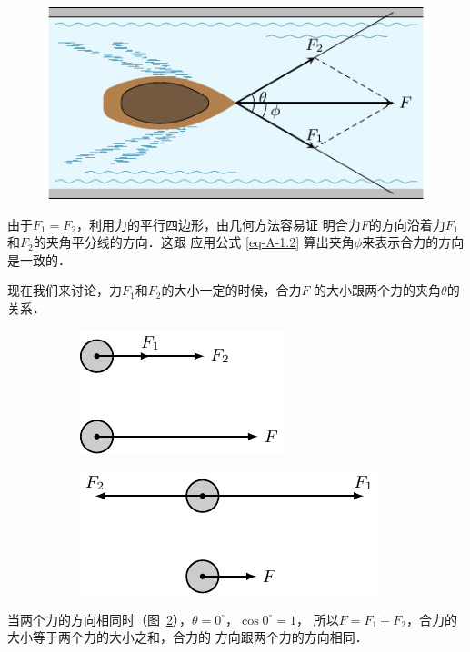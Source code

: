 \begin{figure} [htp]
\centering
\includegraphics{fig/A/1-25.pdf} 
\caption{} \label{fig_A_1-25} 
\end{figure} 

    由于$F_1=F_2$，利用力的平行四边形，由几何方法容易证
明合力$F$的方向沿着力$F_1$和$F_2$的夹角平分线的方向．这跟
应用公式 \eqref{eq-A-1.2} 算出夹角$\phi$来表示合力的方向是一致的．

    现在我们来讨论，力$F_1$和$F_2$的大小一定的时候，合力$F$
的大小跟两个力的夹角$\theta$的关系．

\begin{figure} [htp]
\begin{subfigure} {0.46\linewidth} 
	\centering
	\includegraphics{fig/A/1-26a.pdf} 
	\caption{} \label{fig_A_1-26a} 
\end{subfigure} 
\hfil
\begin{subfigure} {0.46\linewidth} 
	\centering
	\includegraphics{fig/A/1-26b.pdf} 
	\caption{} \label{fig_A_1-26b} 
\end{subfigure} 
\caption{} \label{fig_A_1-26} 
\end{figure} 

    当两个力的方向相同时（图~\ref{fig_A_1-26a}），$\theta =0^\circ$，$\cos 0^\circ=1$，
所以$F=F_1+F_2$，合力的大小等于两个力的大小之和，合力的
方向跟两个力的方向相同．

